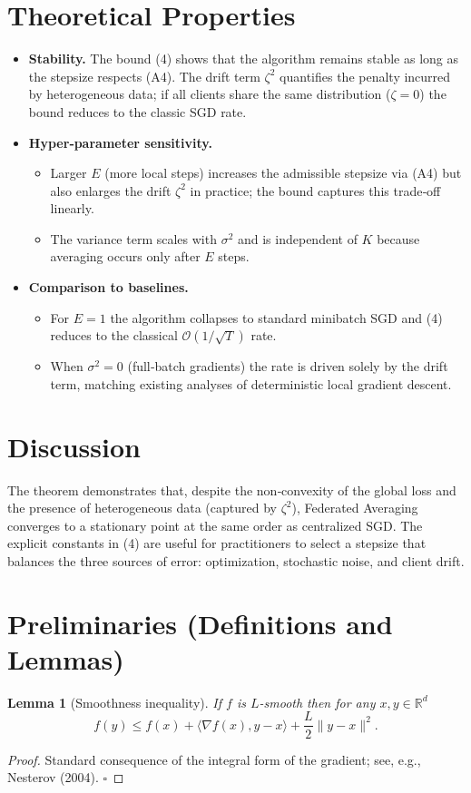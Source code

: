 \documentclass{article}
\newtheorem{lemma}{Lemma}
\begin{document}
\section*{Theoretical Properties}
\begin{itemize}
\item \textbf{Stability.} The bound (4) shows that the algorithm remains stable as long as the stepsize respects (A4). The drift term \(\zeta^{2}\) quantifies the penalty incurred by heterogeneous data; if all clients share the same distribution (\(\zeta=0\)) the bound reduces to the classic SGD rate.
\item \textbf{Hyper‑parameter sensitivity.}
    \begin{itemize}
        \item Larger \(E\) (more local steps) increases the admissible stepsize via (A4) but also enlarges the drift \(\zeta^{2}\) in practice; the bound captures this trade‑off linearly.
        \item The variance term scales with \(\sigma^{2}\) and is independent of \(K\) because averaging occurs only after \(E\) steps.
    \end{itemize}
\item \textbf{Comparison to baselines.}
    \begin{itemize}
        \item For \(E=1\) the algorithm collapses to standard minibatch SGD and (4) reduces to the classical \(\mathcal{O}(1/\sqrt{T})\) rate.
        \item When \(\sigma^{2}=0\) (full‑batch gradients) the rate is driven solely by the drift term, matching existing analyses of deterministic local gradient descent.
    \end{itemize}
\end{itemize}

\section*{Discussion}
The theorem demonstrates that, despite the non‑convexity of the global loss and the presence of heterogeneous data (captured by \(\zeta^{2}\)), Federated Averaging converges to a stationary point at the same order as centralized SGD. The explicit constants in (4) are useful for practitioners to select a stepsize that balances the three sources of error: optimization, stochastic noise, and client drift.

\newpage
\section*{Preliminaries (Definitions and Lemmas)}
\begin{lemma}[Smoothness inequality]\label{lem:smooth}
If \(f\) is \(L\)-smooth then for any \(x,y\in\mathbb{R}^{d}\)
\[
f(y)\le f(x)+\langle\nabla f(x),y-x\rangle+\frac{L}{2}\|y-x\|^{2}. \tag{5}
\]
\end{lemma}
\begin{proof}
Standard consequence of the integral form of the gradient; see, e.g., Nesterov (2004). \(\square\)
\end{proof}
\end{document}
